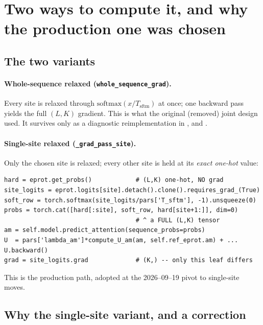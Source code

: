 \documentclass[11pt,a4paper]{article}
\newcommand{\Tsftm}{T_{\mathrm{sftm}}}
\begin{document}
\section{Two ways to compute it, and why the production one was chosen}

\subsection{The two variants}

\paragraph{Whole-sequence relaxed (\texttt{whole\_sequence\_grad}).} Every
site is relaxed through $\mathrm{softmax}(x/\Tsftm)$ at once; one backward
pass yields the full $(L,K)$ gradient. This is what the original (removed)
joint design used. It survives only as a diagnostic reimplementation in
, 
and .

\paragraph{Single-site relaxed (\texttt{\_grad\_pass\_site}).} Only the chosen
site is relaxed; every other site is held at its \emph{exact one-hot} value:
\begin{verbatim}
hard = eprot.get_probs()            # (L,K) one-hot, NO grad
site_logits = eprot.logits[site].detach().clone().requires_grad_(True)
soft_row = torch.softmax(site_logits/pars['T_sftm'], -1).unsqueeze(0)
probs = torch.cat([hard[:site], soft_row, hard[site+1:]], dim=0)
                                    # ^ a FULL (L,K) tensor
am = self.model.predict_attention(sequence_probs=probs)
U  = pars['lambda_am']*compute_U_am(am, self.ref_eprot.am) + ...
U.backward()
grad = site_logits.grad             # (K,) -- only this leaf differs
\end{verbatim}
This is the production path, adopted at the 2026--09--19 pivot to single-site
moves.

\subsection{Why the single-site variant, and a correction}
\end{document}
